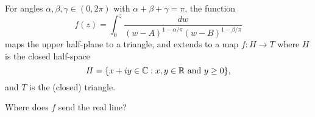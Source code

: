 \documentclass{homework}
\begin{document}
                                                                                \begin{problem}
                                                                                  For angles $\alpha, \beta, \gamma \in (0,2\pi)$ with $\alpha + \beta + \gamma = \pi$, the function
                                                                                    \[
                                                                                        f(z) = \int_0^z \frac{dw}{(w-A)^{1-\alpha/\pi} (w-B)^{1-\beta/\pi}}
                                                                                          \]
                                                                                            maps the upper half-plane to a triangle, and extends to a map $f : H \to T$ where $H$ is the closed half-space
                                                                                              \[
                                                                                                  H = \{ x + iy \in \mathbb{C} : x, y \in \mathbb{R} \mbox{ and } y \geq 0 \},
                                                                                                    \]
                                                                                                      and $T$ is the (closed) triangle.

                                                                                                        Where does $f$ send the real line?
                                                                                                        \end{problem}
\end{document}
